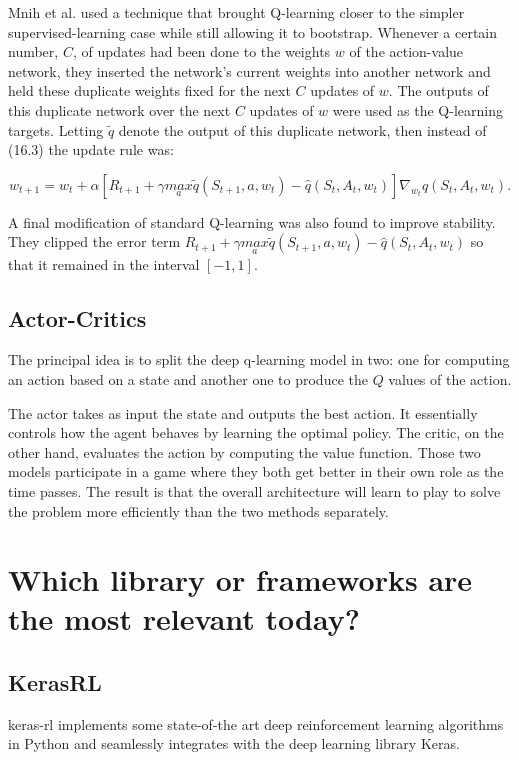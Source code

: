 \documentclass[letterpaper, 10 pt]{IEEEconf}
\begin{document}
Mnih et al. used a technique that brought Q-learning closer to the
simpler supervised-learning case while still allowing it to
bootstrap. Whenever a certain number, $C$, of updates had been done to
the weights $w$ of the action-value network, they inserted the
network’s current weights into another network and held these
duplicate weights fixed for the next $C$ updates of $w$. The outputs
of this duplicate network over the next $C$ updates of $w$ were used
as the Q-learning targets. Letting $\tilde{q}$ denote the output of
this duplicate network, then instead of (16.3) the update rule was:

$$
w_{t+1}=w_t+\alpha[R_{t+1}+\gamma \underset{a}{max} \tilde{q}(S_{t+1},a,w_t)-\hat{q}(S_t,A_t,w_t)]\nabla_{w_t}\hat{q}(S_t,A_t,w_t).
$$

A final modification of standard Q-learning was also found to improve stability. They clipped the error term $R_{t+1}+\gamma \underset{a}{max} \tilde{q}\left(S_{t+1},a,w_t\right)-\hat{q}\left(S_t,A_t,w_t\right)$ so that it remained in the interval $\left[-1,1\right]$.

\subsection{Actor-Critics}

The principal idea is to split the deep q-learning model in two: one for computing an
action based on a state and another one to produce the $Q$ values of the
action.

The actor takes as input the state and outputs the best action. It
essentially controls how the agent behaves by learning the optimal
policy. The critic, on the other hand, evaluates the action by
computing the value function. Those two models participate in a game
where they both get better in their own role as the time passes. The
result is that the overall architecture will learn to play to solve
the problem more efficiently than the two methods separately.

\section{Which library or frameworks are the most relevant today?}

\subsection{KerasRL}

keras-rl\cite{plappert2016kerasrl} implements some state-of-the art deep reinforcement learning
algorithms in Python and seamlessly integrates with the deep learning
library Keras.
\end{document}
